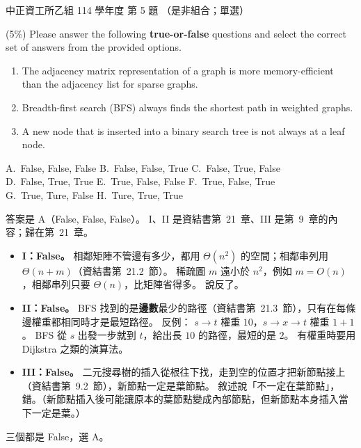 \begin{pastexam}[label={px:ccu-114-csb-05}]{中正資工所乙組 114 學年度 第 5 題}
（是非組合；單選）

(5\%) Please answer the following \textbf{true-or-false} questions and select the correct set of answers from the provided options.
\begin{enumerate}[label=\Roman*.]
\item The adjacency matrix representation of a graph is more memory-efficient than the adjacency list for sparse graphs.
\item Breadth-first search (BFS) always finds the shortest path in weighted graphs.
\item A new node that is inserted into a binary search tree is not always at a leaf node.
\end{enumerate}

A.~False, False, False \qquad B.~False, False, True \qquad C.~False, True, False\\
D.~False, True, True \qquad E.~True, False, False \qquad F.~True, False, True\\
G.~True, Ture, False \qquad H.~Ture, True, True
\end{pastexam}

\begin{pastsoln}
答案是 A（False, False, False）。 I、II 是資結書第~21~章、III 是第~9~章的內容；歸在第~21~章。

\begin{itemize}
\item \textbf{I：False。} 相鄰矩陣不管邊有多少，都用 $\Theta(n^2)$ 的空間；相鄰串列用 $\Theta(n + m)$（資結書第~21.2~節）。 稀疏圖
$m$ 遠小於 $n^2$，例如 $m = O(n)$，相鄰串列只要 $\Theta(n)$，比矩陣省得多。 說反了。
\item \textbf{II：False。} BFS 找到的是\textbf{邊數}最少的路徑（資結書第~21.3~節），只有在每條邊權重都相同時才是最短路徑。 反例：
$s \to t$ 權重 $10$，$s \to x \to t$ 權重 $1 + 1$。 BFS 從 $s$ 出發一步就到 $t$，給出長 $10$ 的路徑，最短的是 $2$。 有權重時要用
Dijkstra 之類的演算法。
\item \textbf{III：False。} 二元搜尋樹的插入從根往下找，走到空的位置才把新節點接上（資結書第~9.2~節），新節點一定是葉節點。
敘述說「不一定在葉節點」，錯。（新節點插入後可能讓原本的葉節點變成內部節點，但新節點本身插入當下一定是葉。）
\end{itemize}
三個都是 False，選 A。
\end{pastsoln}

